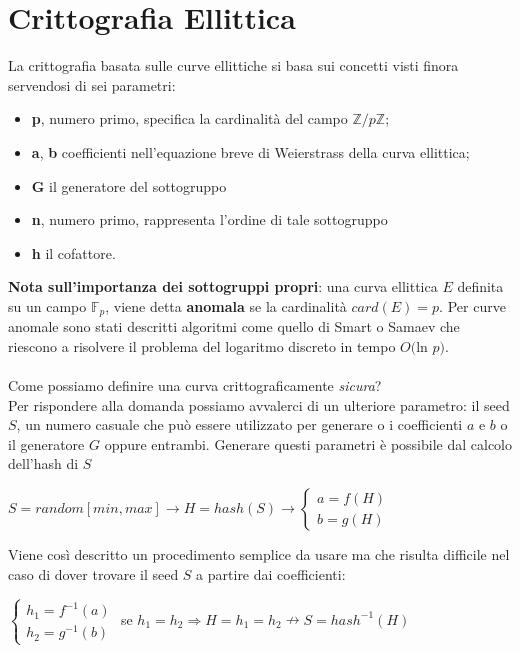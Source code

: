 \documentclass[a4paper,12pt]{tesiinfo}
\begin{document}
\chapter{Crittografia Ellittica}
La crittografia basata sulle curve ellittiche si basa sui concetti visti finora servendosi di sei parametri:
\begin{itemize}
    \item \textbf{p}, numero primo, specifica la cardinalit\`a del campo $\mathbb{Z}/p\mathbb{Z}$;
    \item \textbf{a}, \textbf{b} coefficienti nell'equazione breve di Weierstrass della curva ellittica;
    \item \textbf{G} il generatore del sottogruppo
    \item \textbf{n}, numero primo, rappresenta l'ordine di tale sottogruppo
    \item \textbf{h} il cofattore.
\end{itemize}
\textbf{Nota sull'importanza dei sottogruppi propri}: una curva ellittica $E$ definita su un campo $\mathbb{F}_p$, viene detta \textbf{anomala} se la cardinalit\`a $card(E) = p$. Per curve anomale sono stati descritti algoritmi come quello di Smart o Samaev che riescono a risolvere il problema del logaritmo discreto in tempo $O($ln $p)$.
\\
\\
Come possiamo definire una curva crittograficamente \textit{sicura}?
\\
Per rispondere alla domanda possiamo avvalerci di un ulteriore parametro: il seed $S$, un numero casuale che pu\`o essere utilizzato per generare o i coefficienti $a$ e $b$ o il generatore $G$ oppure entrambi. Generare questi parametri \`e possibile dal calcolo dell'hash di $S$
\begin{center}
    $S = random[min, max] \to H = hash(S) \to 
    \begin{cases}
        a = f(H)\\
        b = g(H)
    \end{cases}$
\end{center}
Viene cos\`i descritto un procedimento semplice da usare ma che risulta difficile nel caso di dover trovare il seed $S$ a partire dai coefficienti:
\begin{center}
$
\begin{cases}
    h_1 = f^{-1} (a)\\
    h_2 = g^{-1} (b)
\end{cases}$ se 
$h_1 = h_2 \Rightarrow H=h_1=h_2 \nrightarrow S=hash^{-1} (H)$
\end{center}
\end{document}
